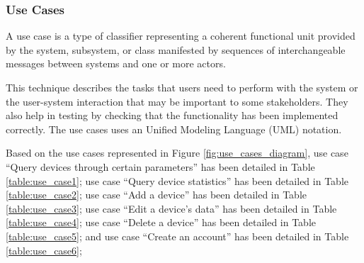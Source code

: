 \subsubsection{Use Cases}

A use case is a type of classifier representing a
coherent functional unit provided by the system, subsystem, or class manifested
by sequences of interchangeable messages between systems and one or more
actors.

This technique describes the tasks that users need to perform with
the system or the user-system interaction that may be important to some
stakeholders. They also help in testing by checking that the functionality
has been implemented correctly. The use cases uses an Unified Modeling
Language (UML) notation.

Based on the use cases represented in Figure \ref{fig:use_cases_diagram},
use case ``Query devices through certain parameters'' has been detailed in Table \ref{table:use_case1};
use case ``Query device statistics'' has been detailed in Table \ref{table:use_case2};
use case ``Add a device'' has been detailed in Table \ref{table:use_case3};
use case ``Edit a device's data'' has been detailed in Table \ref{table:use_case4};
use case ``Delete a device'' has been detailed in Table \ref{table:use_case5};
and use case ``Create an account'' has been detailed in Table \ref{table:use_case6};

